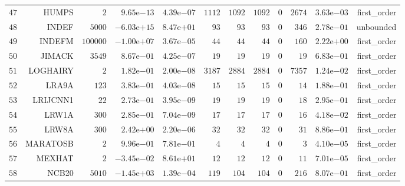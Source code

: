 \begin{longtable}{rrrrrrrrrrrr}
  \(    47\) & HUMPS & \(     2\) & \( 9.65\)e\(-13\) & \( 4.39\)e\(-07\) & \(  1112\) & \(  1092\) & \(  1092\) & \(     0\) & \(  2674\) & \( 3.63\)e\(-03\) & first\_order \\
  \(    48\) & INDEF & \(  5000\) & \(-6.03\)e\(+15\) & \( 8.47\)e\(+01\) & \(    93\) & \(    93\) & \(    93\) & \(     0\) & \(   346\) & \( 2.78\)e\(-01\) & unbounded \\
  \(    49\) & INDEFM & \(100000\) & \(-1.00\)e\(+07\) & \( 3.67\)e\(-05\) & \(    44\) & \(    44\) & \(    44\) & \(     0\) & \(   160\) & \( 2.22\)e\(+00\) & first\_order \\
  \(    50\) & JIMACK & \(  3549\) & \( 8.67\)e\(-01\) & \( 4.25\)e\(-07\) & \(    19\) & \(    19\) & \(    19\) & \(     0\) & \(    19\) & \( 6.83\)e\(-01\) & first\_order \\
  \(    51\) & LOGHAIRY & \(     2\) & \( 1.82\)e\(-01\) & \( 2.00\)e\(-08\) & \(  3187\) & \(  2884\) & \(  2884\) & \(     0\) & \(  7357\) & \( 1.24\)e\(-02\) & first\_order \\
  \(    52\) & LRA9A & \(   123\) & \( 3.83\)e\(-01\) & \( 4.03\)e\(-08\) & \(    15\) & \(    15\) & \(    15\) & \(     0\) & \(    14\) & \( 1.88\)e\(-01\) & first\_order \\
  \(    53\) & LRIJCNN1 & \(    22\) & \( 2.73\)e\(-01\) & \( 3.95\)e\(-09\) & \(    19\) & \(    19\) & \(    19\) & \(     0\) & \(    18\) & \( 2.95\)e\(-01\) & first\_order \\
  \(    54\) & LRW1A & \(   300\) & \( 2.85\)e\(-01\) & \( 7.04\)e\(-09\) & \(    17\) & \(    17\) & \(    17\) & \(     0\) & \(    16\) & \( 4.18\)e\(-02\) & first\_order \\
  \(    55\) & LRW8A & \(   300\) & \( 2.42\)e\(+00\) & \( 2.20\)e\(-06\) & \(    32\) & \(    32\) & \(    32\) & \(     0\) & \(    31\) & \( 8.86\)e\(-01\) & first\_order \\
  \(    56\) & MARATOSB & \(     2\) & \( 9.96\)e\(-01\) & \( 7.81\)e\(-01\) & \(     4\) & \(     4\) & \(     4\) & \(     0\) & \(     3\) & \( 4.10\)e\(-05\) & first\_order \\
  \(    57\) & MEXHAT & \(     2\) & \(-3.45\)e\(-02\) & \( 8.61\)e\(+01\) & \(    12\) & \(    12\) & \(    12\) & \(     0\) & \(    11\) & \( 7.01\)e\(-05\) & first\_order \\
  \(    58\) & NCB20 & \(  5010\) & \(-1.45\)e\(+03\) & \( 1.39\)e\(-04\) & \(   119\) & \(   104\) & \(   104\) & \(     0\) & \(   216\) & \( 8.07\)e\(-01\) & first\_order \\

\end{longtable}
